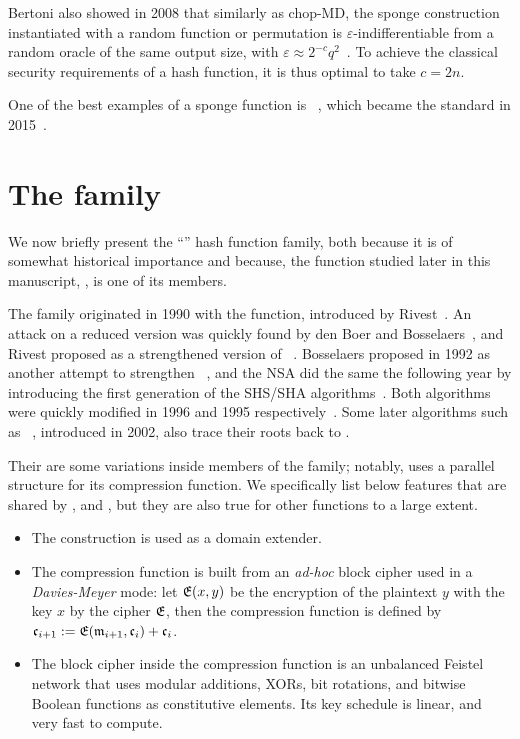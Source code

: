 Bertoni \etal also showed in 2008 that similarly as chop-MD, the sponge construction instantiated with a random function or permutation is $\varepsilon$-indifferentiable from a random oracle
of the same output size, with $\varepsilon \approx 2^{-c}q^2$~\cite{DBLP:conf/eurocrypt/BertoniDPA08}. To achieve the classical security requirements of a hash function, it is thus optimal to take $c = 2n$.

One of the best examples of a sponge function is \keccak~\cite{KeccakReference}, which became the \shathree standard in 2015~\cite{Nist-SHA3}. 

\section{The \mdsha family}
\label{sec:mdsha}
We now briefly present the ``\mdsha'' hash function family, both because it is of somewhat historical importance and because, the function studied later in this manuscript, \shaone, is one of its members.

The family originated in 1990 with the \mdfour function, introduced by Rivest~\cite{Rivest-md4}. An attack on a reduced version was quickly found by den Boer and Bosselaers~\cite{DBLP:conf/crypto/BoerB91},
and Rivest proposed \mdfive as a strengthened version of \mdfour~\cite{Rivest-md5}. Bosselaers proposed \ripemd in 1992 as another attempt to strengthen \mdfour~\cite[Chap. 3]{DBLP:books/sp/BosselaersP95},
and the NSA did the same the following year by introducing the first generation of the SHS/SHA algorithms~\cite{Nist-SHA0}. Both algorithms were quickly modified in 1996 and 1995 respectively~\cite{DBLP:conf/fse/DobbertinBP96,Nist-SHA1}.
Some later algorithms such as \shatwo~\cite{Nist-SHA}, introduced in 2002, also trace their roots back to \mdfour.

Their are some variations inside members of the family; notably, \ripemd uses a parallel structure for its compression function. We specifically list below features that are shared by \mdfour, \mdfive and \sha, but they are also
true for other \mdsha functions to a large extent.
\begin{itemize}
\item The \merkdam construction is used as a domain extender.
\item The compression function is built from an \emph{ad-hoc} block cipher used in a \emph{Davies-Meyer} mode: let $\operatorname{\mathfrak{E}}(x,y)$ be the encryption of the plaintext $y$ with the key $x$ by the cipher $\operatorname{\mathfrak{E}}$, then
the compression function is defined by
$\mathfrak{c}_{i+1} := \operatorname{\mathfrak{E}}(\mathfrak{m}_{i+1},\mathfrak{c}_i) + \mathfrak{c}_i$.
\item The block cipher inside the compression function is an unbalanced Feistel network that uses modular additions, XORs, bit rotations, and bitwise Boolean functions as constitutive elements. Its key schedule is linear, and very fast to compute. 
\end{itemize}

